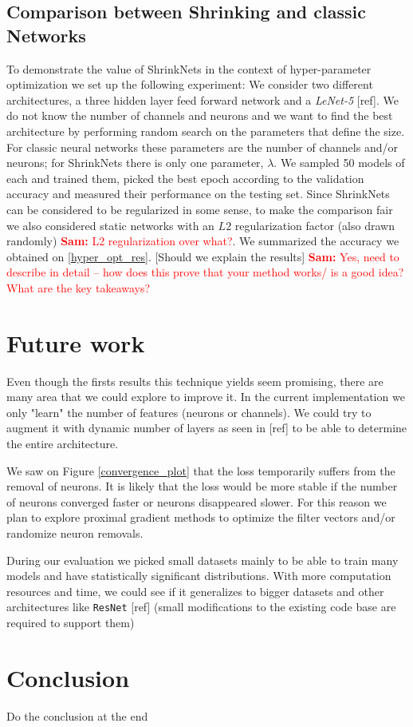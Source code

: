 \documentclass[sigconf]{acmart}
\newcommand{\srm}[1]{\textcolor{red}{{\bf Sam:} #1}}
\begin{document}
\subsection{Comparison between Shrinking and classic Networks}

To demonstrate the value of ShrinkNets in the context of hyper-parameter optimization we set up the following experiment: We consider two different architectures, a three hidden layer feed forward network and a \textit{LeNet-5} [ref]. We do not know the number of channels and neurons and we want to find the best architecture by performing random search on the parameters that define the size. For classic neural networks these parameters are the number of channels and/or neurons; for ShrinkNets there is only one parameter, $\lambda$. We sampled 50 models of each and trained them, picked the best epoch according to the validation accuracy and measured their performance on the testing set. Since ShrinkNets can be considered to be regularized in some sense, to make the comparison fair we also considered static networks with an $L2$ regularization factor (also drawn randomly) \srm{L2 regularization over what?}. We summarized the accuracy we obtained on \autoref{hyper_opt_res}. [Should we explain the results] \srm{Yes, need to describe in detail -- how does this prove that your method works/ is a good idea?  What are the key takeaways?}

\section{Future work}

\par Even though the firsts results this technique yields seem promising, there are many area that we could explore to improve it. In the current implementation we only "learn" the number of features (neurons or channels). We could try to augment it with dynamic number of layers as seen in [ref] to be able to determine the entire architecture.
\par We saw on Figure \ref{convergence_plot} that the loss temporarily suffers from the removal of neurons. It is likely that the loss would be more stable if the number of neurons converged faster or neurons disappeared slower. For this reason we plan to explore proximal gradient methods to optimize the filter vectors and/or randomize neuron removals.
\par During our evaluation we picked small datasets mainly to be able to train many models and have statistically significant distributions. With more computation resources and time, we could see if it generalizes to bigger datasets and other architectures like \texttt{ResNet} [ref] (small modifications to the existing code base are required to support them)

\section{Conclusion}
Do the conclusion at the end



\end{document}
